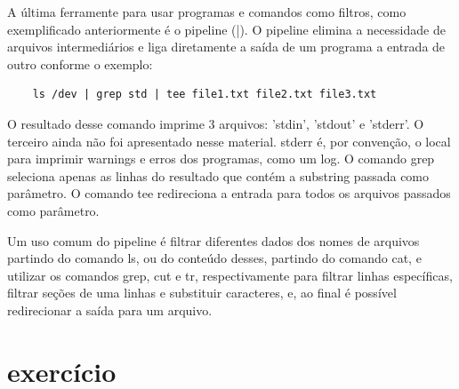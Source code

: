 \documentclass[oneside, 11 pt]{article}
\begin{document}
	A última ferramente para usar programas e comandos como filtros, como exemplificado anteriormente é o pipeline (|). O pipeline elimina a necessidade de arquivos intermediários e liga diretamente a saída de um programa a entrada de outro conforme o exemplo:
	
	\begin{lstlisting}
	ls /dev | grep std | tee file1.txt file2.txt file3.txt
	\end{lstlisting}
	O resultado desse comando imprime 3 arquivos: 'stdin', 'stdout' e 'stderr'. O terceiro ainda não foi apresentado nesse material. stderr é, por convenção, o local para imprimir warnings e erros dos programas, como um log.
	O comando grep seleciona apenas as linhas do resultado que contém a substring passada como parâmetro. O comando tee redireciona a entrada para todos os arquivos passados como parâmetro.
	
	Um uso comum do pipeline é filtrar diferentes dados dos nomes de arquivos partindo do comando ls, ou do conteúdo desses, partindo do comando cat, e utilizar os comandos grep, cut e tr, respectivamente para filtrar linhas específicas, filtrar seções de uma linhas e substituir caracteres, e, ao final é possível redirecionar a saída para um arquivo.
	
	\section{exercício}
	
\end{document}
